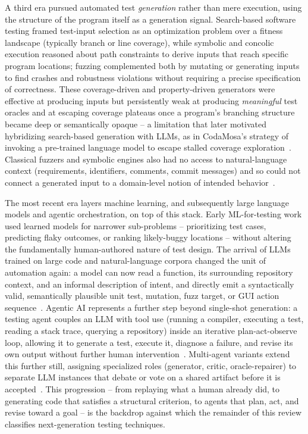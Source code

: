 A third era pursued automated test \emph{generation} rather than mere
execution, using the structure of the program itself as a generation
signal. Search-based software testing framed test-input selection as
an optimization problem over a fitness landscape (typically branch or
line coverage), while symbolic and concolic execution reasoned about
path constraints to derive inputs that reach specific program
locations; fuzzing complemented both by mutating or generating inputs
to find crashes and robustness violations without requiring a precise
specification of correctness. These coverage-driven and property-driven
generators were effective at producing inputs but persistently weak at
producing \emph{meaningful} test oracles and at escaping coverage
plateaus once a program's branching structure became deep or
semantically opaque -- a limitation that later motivated hybridizing
search-based generation with LLMs, as in CodaMosa's strategy of
invoking a pre-trained language model to escape stalled coverage
exploration~\cite{slr0122023}. Classical fuzzers and symbolic engines
also had no access to natural-language context (requirements,
identifiers, comments, commit messages) and so could not connect a
generated input to a domain-level notion of intended
behavior~\cite{xia2024,deng2023,deng2023b}.

The most recent era layers machine learning, and subsequently large
language models and agentic orchestration, on top of this stack.
Early ML-for-testing work used learned models for narrower sub-problems
-- prioritizing test cases, predicting flaky outcomes, or ranking
likely-buggy locations -- without altering the fundamentally
human-authored nature of test design. The arrival of LLMs trained on
large code and natural-language corpora changed the unit of automation
again: a model can now read a function, its surrounding repository
context, and an informal description of intent, and directly emit a
syntactically valid, semantically plausible unit test, mutation, fuzz
target, or GUI action sequence~\cite{slr0012024,slr0022024,slr0032023}.
Agentic AI represents a further step beyond single-shot generation: a
testing agent couples an LLM with tool use (running a compiler,
executing a test, reading a stack trace, querying a repository) inside
an iterative plan-act-observe loop, allowing it to generate a test,
execute it, diagnose a failure, and revise its own output without
further human intervention~\cite{slr0232024,slr0252024,slr0242024}.
Multi-agent variants extend this further still, assigning specialized
roles (generator, critic, oracle-repairer) to separate LLM instances
that debate or vote on a shared artifact before it is
accepted~\cite{slr0192025,xu2025candor,slr0222026}. This progression --
from replaying what a human already did, to generating code that
satisfies a structural criterion, to agents that plan, act, and revise
toward a goal -- is the backdrop against which the remainder of this
review classifies next-generation testing techniques.


